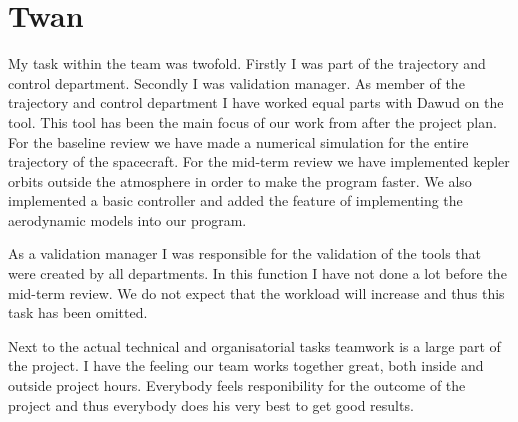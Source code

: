 \section{Twan}

My task within the team was twofold. Firstly I was part of the trajectory and control department. Secondly I was validation manager. As member of the trajectory and control department I have worked equal parts with Dawud on the tool. This tool has been the main focus of our work from after the project plan. For the baseline review we have made a numerical simulation for the entire trajectory of the spacecraft. For the mid-term review we have implemented kepler orbits outside the atmosphere in order to make the program faster. We also implemented a basic controller and added the feature of implementing the aerodynamic models into our program.

As a validation manager I was responsible for the validation of the tools that were created by all departments. In this function I have not done a lot before the mid-term review. We do not expect that the workload will increase and thus this task has been omitted.

Next to the actual technical and organisatorial tasks teamwork is a large part of the project. I have the feeling our team works together great, both inside and outside project hours. Everybody feels responibility for the outcome of the project and thus everybody does his very best to get good results.